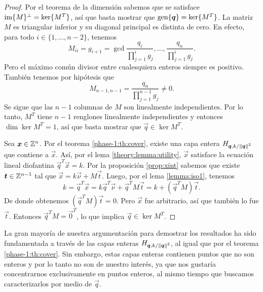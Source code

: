 \begin{proof}
	Por el teorema de la dimensión sabemos que se satisface $\operatorname{im}\lbrace M \rbrace^\perp = \operatorname{ker}\lbrace M^T \rbrace$, así que
	basta mostrar que $\operatorname{gen}\lbrace \boldsymbol{q} \rbrace = \operatorname{ker}\lbrace M^T \rbrace$. La matriz $M$ es triangular inferior y su
	diagonal principal es distinta de cero. En efecto, para todo $i \in \lbrace 1, \ldots, n -
	2\rbrace$, tenemos
	\begin{equation*}
		M_{ii} = g_{i + 1} = \gcd{\frac{q_i}{\prod_{j=1}^{i}g_j}, \ldots,
		\frac{q_n}{\prod_{j=1}^{i}g_j}}.
	\end{equation*}
	Pero el máximo común divisor entre cualesquiera enteros siempre es positivo. También tenemos por
	hipótesis que
	\begin{equation*}
		M_{n-1, n-1} = \frac{q_n}{\prod_{j=1}^{n-1}g_j} \neq 0.
	\end{equation*}
	Se sigue que las $n - 1$ columnas de $M$ son linealmente independientes.
	Por lo tanto, $M^T$ tiene $n - 1$ renglones linealmente independientes y
	entonces $\dim \ker{M^T} = 1$, así que basta mostrar que $\vec{q} \in
	\ker{M^T}$.

	Sea $\boldsymbol{x} \in \mathbb{Z}^n$. Por el teorema \ref{phase-1:th:cover}, existe una capa entera
	$H_{\boldsymbol{q}, k/\left\lVert \boldsymbol{q} \right\rVert^{2}}$ que contiene a $\vec{x}$. Así, por el lema
	\ref{theory:lemma:utility}, $\vec{x}$ satisface la
	ecuación lineal diofantina $\vec{q}^T\vec{x} = k$.
	Por la proposición \ref{prop:xint} sabemos que existe $\boldsymbol{t} \in \mathbb{Z}^{n-1}$ tal que $\vec{x} =
	k\vec{\nu} + M\vec{t}$. Luego, por el lema \ref{lemma:iso1}, tenemos
	\begin{equation*}
		k = \vec{q}^T\vec{x} = k \vec{q}^T\vec{\nu} + \vec{q}^TM\vec{t} = k +
		(\vec{q}^TM)\vec{t}.
	\end{equation*}
	De donde obtenemos $(\vec{q}^TM)\vec{t} = 0$. Pero $\vec{x}$ fue arbitrario, así que también lo
	fue $\vec{t}$. Entonces $\vec{q}^TM = \vec{0}^T$, lo que implica $\vec{q} \in \ker{M^T}$.
\end{proof}

La gran mayoría de nuestra argumentación para demostrar los resultados ha sido fundamentada a través
de las capas enteras $H_{\boldsymbol{q}, k/\left\lVert \boldsymbol{q} \right\rVert^{2}}$, al igual que por el teorema \ref{phase-1:th:cover}. Sin embargo,
estas capas enteras contienen puntos que no son enteros y por lo tanto no son de nuestro interés, ya
que nos gustaría concentrarnos exclusivamente en puntos enteros, al mismo tiempo que buscamos
caracterizarlos por medio de $\vec{q}$.


